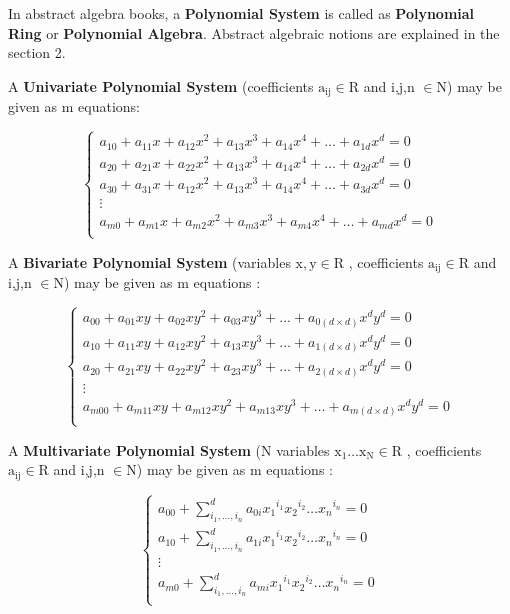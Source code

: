 \documentclass[11pt]{article}
\begin{document}
In abstract algebra books,  a \textbf{Polynomial System} is called as \textbf{Polynomial Ring} or \textbf{Polynomial Algebra}. \cite{wolframPolynomial} Abstract algebraic notions are explained in the section 2.

A \textbf{Univariate Polynomial System}  (coefficients  $\mathrm{a_{ij} \in R}$  and i,j,n $\mathrm{\in N}$) may be given as m equations: 

\begin{equation}  
   \begin{cases}
    a_{10}+a_{11}x+a_{12}x^2+a_{13}x^3+a_{14}x^4+\ldots+a_{1d}x^d=0 \\
    a_{20}+a_{21}x+a_{22}x^2+a_{13}x^3+a_{14}x^4+\ldots+a_{2d}x^d=0 \\
    a_{30}+a_{31}x+a_{12}x^2+a_{13}x^3+a_{14}x^4+\ldots+a_{3d}x^d=0 \\
    \vdots \\
    a_{m0}+a_{m1}x+a_{m2}x^2+a_{m3}x^3+a_{m4}x^4+\ldots+a_{md}x^d=0 \\
  \end{cases}
\end{equation}


A \textbf{Bivariate Polynomial System}  (variables  $\mathrm{x,y \in R}$ ,  coefficients  $\mathrm{a_{ij} \in R}$  and i,j,n $\mathrm{\in N}$) may be given as m equations : 

\begin{equation}  
   \begin{cases}
    a_{00}+a_{01}xy+a_{02}xy^2+a_{03}xy^3+\ldots+a_{0(d \times d)}x^dy^d=0 \\
    a_{10}+a_{11}xy+a_{12}xy^2+a_{13}xy^3+\ldots+a_{1(d \times d)}x^dy^d=0 \\
    a_{20}+a_{21}xy+a_{22}xy^2+a_{23}xy^3+\ldots+a_{2(d \times d)}x^dy^d=0 \\
    \vdots \\
    a_{m00}+a_{m11}xy+a_{m12}xy^2+a_{m13}xy^3+\ldots+a_{m(d \times d)}x^dy^d=0 \\
  \end{cases}
\end{equation}


A \textbf{Multivariate Polynomial System}  (N variables  $\mathrm{x_1 \ldots x_N \in R}$ ,  coefficients  $\mathrm{a_{ij} \in R}$  and i,j,n $\mathrm{\in N}$) may be given as m equations : 

\begin{equation}  
   \begin{cases}
    a_{00}+\sum_{i_1,\ldots,i_n}^{d}{a_{0i}{x_1}^{i_1}{x_2}^{i_2} \ldots {x_n}^{i_n} }=0 \\
    a_{10}+\sum_{i_1,\ldots,i_n}^{d}{a_{1i}{x_1}^{i_1}{x_2}^{i_2} \ldots {x_n}^{i_n} }=0 \\
    \vdots \\
    a_{m0}+\sum_{i_1,\ldots,i_n}^{d}{a_{mi}{x_1}^{i_1}{x_2}^{i_2} \ldots {x_n}^{i_n} }=0 \\
  \end{cases}
\end{equation}
\end{document}
